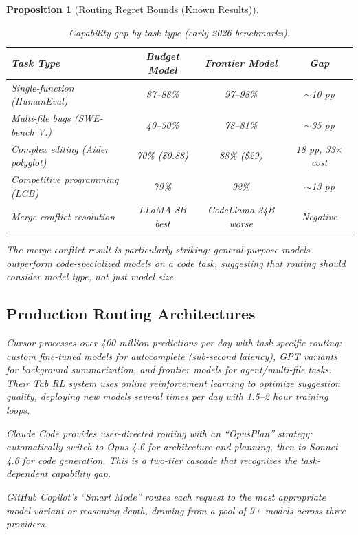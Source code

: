 \documentclass[11pt, a4paper, copyright]{googledeepmind}
\newtheorem{proposition}{Proposition}[section]
\begin{document}
\begin{proposition}[Routing Regret Bounds (Known Results)]
\begin{table}[htbp]
\centering
\caption{Capability gap by task type (early 2026 benchmarks).}
\label{tab:capgaps}
\begin{tabular}{lccc}
\toprule
\textbf{Task Type} & \textbf{Budget Model} & \textbf{Frontier Model} & \textbf{Gap} \\
\midrule
Single-function (HumanEval) & 87--88\% & 97--98\% & $\sim$10 pp \\
Multi-file bugs (SWE-bench V.) & 40--50\% & 78--81\% & $\sim$35 pp \\
Complex editing (Aider polyglot) & 70\% (\$0.88) & 88\% (\$29) & 18 pp, 33$\times$ cost \\
Competitive programming (LCB) & 79\% & 92\% & $\sim$13 pp \\
Merge conflict resolution & LLaMA-8B best & CodeLlama-34B worse & Negative \\
\bottomrule
\end{tabular}
\end{table}

The merge conflict result \citep{zhu2024congra} is particularly striking: general-purpose models outperform code-specialized models on a code task, suggesting that routing should consider model \emph{type}, not just model \emph{size}.

\subsection{Production Routing Architectures}

Cursor processes over 400 million predictions per day with task-specific routing: custom fine-tuned models for autocomplete (sub-second latency), GPT variants for background summarization, and frontier models for agent/multi-file tasks. Their Tab RL system uses online reinforcement learning to optimize suggestion quality, deploying new models several times per day with 1.5--2 hour training loops.

Claude Code provides user-directed routing with an ``OpusPlan'' strategy: automatically switch to Opus 4.6 for architecture and planning, then to Sonnet 4.6 for code generation. This is a two-tier cascade that recognizes the task-dependent capability gap.

GitHub Copilot's ``Smart Mode'' routes each request to the most appropriate model variant or reasoning depth, drawing from a pool of 9+ models across three providers.



\end{proposition}
\end{document}
